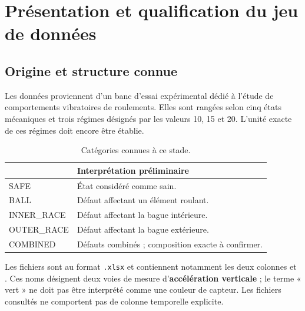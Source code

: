 \chapter{Présentation et qualification du jeu de données}
\label{chap:donnees}

\section{Origine et structure connue}
Les données proviennent d'un banc d'essai expérimental dédié à l'étude de comportements vibratoires de roulements. Elles sont rangées selon cinq états mécaniques et trois régimes désignés par les valeurs 10, 15 et 20. L'unité exacte de ces régimes doit encore être établie.

\begin{table}[htbp]
\centering\small
\caption{Catégories connues à ce stade.}
\label{tab:classes}
\begin{tabularx}{\textwidth}{@{}>{\ttfamily}lX@{}}
\toprule
\multicolumn{1}{@{}l}{\bfseries Dossier} & \bfseries Interprétation préliminaire\\
\midrule
SAFE & État considéré comme sain.\\
BALL & Défaut affectant un élément roulant.\\
INNER\_RACE & Défaut affectant la bague intérieure.\\
OUTER\_RACE & Défaut affectant la bague extérieure.\\
COMBINED & Défauts combinés ; composition exacte à confirmer.\\
\bottomrule
\end{tabularx}
\end{table}

Les fichiers sont au format \texttt{.xlsx} et contiennent notamment les deux colonnes  et . Ces noms désignent deux voies de mesure d'\textbf{accélération verticale} ; le terme « vert » ne doit pas être interprété comme une couleur de capteur. Les fichiers consultés ne comportent pas de colonne temporelle explicite.


